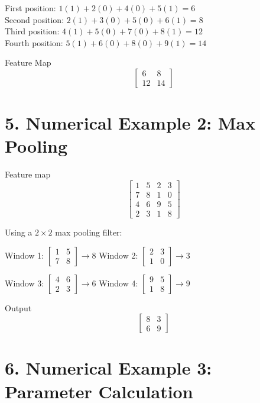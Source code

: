 \documentclass[11pt]{article}
\begin{document}
First position: $1(1)+2(0)+4(0)+5(1)=6$\\
Second position: $2(1)+3(0)+5(0)+6(1)=8$\\
Third position: $4(1)+5(0)+7(0)+8(1)=12$\\
Fourth position: $5(1)+6(0)+8(0)+9(1)=14$

Feature Map
\[
\begin{bmatrix}
6&8\\
12&14
\end{bmatrix}
\]


\section*{5. Numerical Example 2: Max Pooling}

Feature map
\[
\begin{bmatrix}
1&5&2&3\\
7&8&1&0\\
4&6&9&5\\
2&3&1&8
\end{bmatrix}
\]

Using a $2\times2$ max pooling filter:

Window 1: $\begin{bmatrix}1&5\\7&8\end{bmatrix}\rightarrow 8$ \quad
Window 2: $\begin{bmatrix}2&3\\1&0\end{bmatrix}\rightarrow3$

Window 3: $\begin{bmatrix}4&6\\2&3\end{bmatrix}\rightarrow6$ \quad
Window 4: $\begin{bmatrix}9&5\\1&8\end{bmatrix}\rightarrow9$

Output
\[
\begin{bmatrix}
8&3\\
6&9
\end{bmatrix}
\]


\section*{6. Numerical Example 3: Parameter Calculation}
\end{document}
